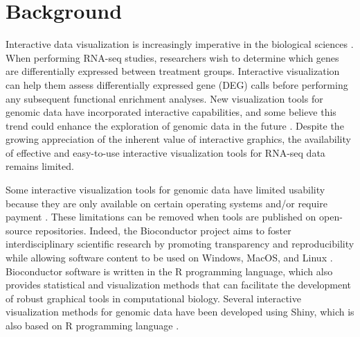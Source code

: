 \documentclass{bmcart}
\begin{document}



\section*{Background}

Interactive data visualization is increasingly imperative in the biological sciences \cite{o2010visualizing}. When performing RNA-seq studies, researchers wish to determine which genes are differentially expressed between treatment groups. Interactive visualization can help them assess differentially expressed gene (DEG) calls before performing any subsequent functional enrichment analyses. New visualization tools for genomic data have incorporated interactive capabilities, and some believe this trend could enhance the exploration of genomic data in the future \cite{pavlopoulos2015visualizing}. Despite the growing appreciation of the inherent value of interactive graphics, the availability of effective and easy-to-use interactive visualization tools for RNA-seq data remains limited.

Some interactive visualization tools for genomic data have limited usability because they are only available on certain operating systems and/or require payment \cite{seo2002interactively, ahlberg1996spotfire, chu2001genespringtm}. These limitations can be removed when tools are published on open-source repositories. Indeed, the Bioconductor project aims to foster interdisciplinary scientific research by promoting transparency and reproducibility while allowing software content to be used on Windows, MacOS, and Linux \cite{gentleman2004bioconductor}. Bioconductor software is written in the R programming language, which also provides statistical and visualization methods that can facilitate the development of robust graphical tools in computational biology. Several interactive visualization methods for genomic data have been developed using Shiny, which is also based on R programming language \cite{rue2018isee, schultheis2018wilson, hughes2017expressiondb}. 
\end{document}
